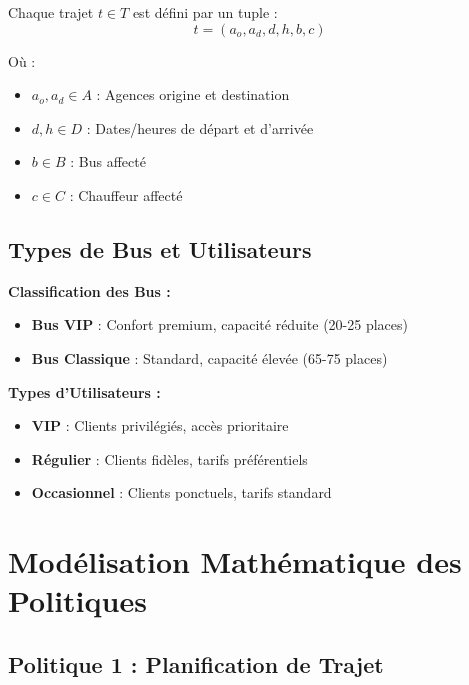 \documentclass[12pt,a4paper]{article}
\begin{document}
    Chaque trajet $t \in T$ est défini par un tuple :
    \begin{equation}
        t = (a_o, a_d, d, h, b, c)
    \end{equation}

    Où :
    \begin{itemize}
        \item $a_o, a_d \in A$ : Agences origine et destination
        \item $d, h \in D$ : Dates/heures de départ et d'arrivée
        \item $b \in B$ : Bus affecté
        \item $c \in C$ : Chauffeur affecté
    \end{itemize}

    \subsection{Types de Bus et Utilisateurs}

    \begin{policybox}
        \textbf{Classification des Bus :}
        \begin{itemize}
            \item \textbf{Bus VIP} : Confort premium, capacité réduite (20-25 places)
            \item \textbf{Bus Classique} : Standard, capacité élevée (65-75 places)
        \end{itemize}

        \textbf{Types d'Utilisateurs :}
        \begin{itemize}
            \item \textbf{VIP} : Clients privilégiés, accès prioritaire
            \item \textbf{Régulier} : Clients fidèles, tarifs préférentiels
            \item \textbf{Occasionnel} : Clients ponctuels, tarifs standard
        \end{itemize}
    \end{policybox}

    \newpage

    \section{Modélisation Mathématique des Politiques}

    \subsection{Politique 1 : Planification de Trajet}
\end{document}
